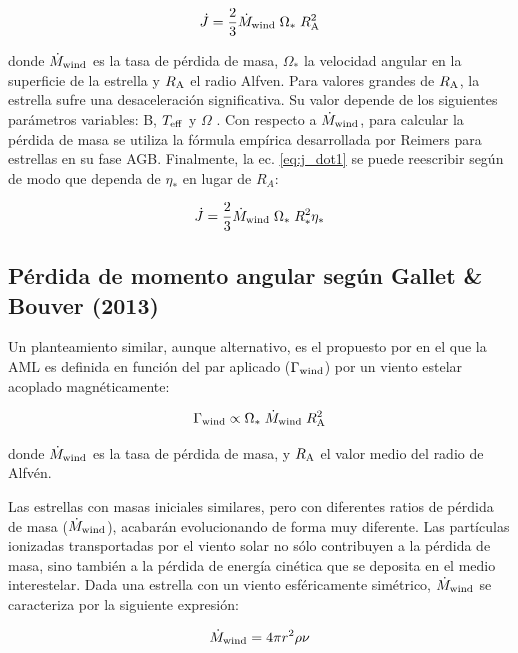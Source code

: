 \begin{equation}
 \Dot{J} = \frac{2}{3} \Dot{M}_{\mathrm{wind}} \; \Omega_* \; R_{\mathrm{A}}^{2} \label{eq:j_dot1}
\end{equation}

donde $\Dot{M}_{\mathrm{wind}}$ es la tasa de pérdida de masa, $\Omega_*$ la velocidad angular en la superficie de la estrella y $R_{\mathrm{A}}$ el radio Alfven. Para valores grandes de $R_{\mathrm{A}}$, la estrella sufre una desaceleración significativa. Su valor depende de los siguientes parámetros variables: B, $T_{\mathrm{eff}}$ y $\Omega$ \citep{Gallet2015}. Con respecto a $\Dot{M}_{\mathrm{wind}}$, para calcular la pérdida de masa se utiliza la fórmula empírica desarrollada por Reimers \citep{Reimers1975} para estrellas en su fase AGB. Finalmente, la ec. \ref{eq:j_dot1} se puede reescribir según \cite{Ud-Doula2008} de modo que dependa de $\eta_*$ en lugar de $R_A$:

\begin{equation}
 \Dot{J} = \frac{2}{3} \Dot{M}_{\mathrm{wind}} \; \Omega_* \; R^{2}_{*}\eta_* \label{eq:j_dot_mesa}
\end{equation}

\subsection{Pérdida de momento angular según Gallet \& Bouver (2013)}
Un planteamiento similar, aunque alternativo, es el propuesto por \cite{Gallet2013} en el que la AML es definida en función del par aplicado ($\Gamma_{\mathrm{wind}}$) por un viento estelar acoplado magnéticamente:

\begin{equation}
	\Gamma_{\mathrm{wind}} \propto \Omega_* \; \Dot{M}_{\mathrm{wind}} \; R_{\mathrm{A}}^{2} \label{eq:mb_torque}
\end{equation}

donde $\Dot{M}_{\mathrm{wind}}$ es la tasa de pérdida de masa, y $R_{\mathrm{A}}$ el valor medio del radio de Alfvén. \par

Las estrellas con masas iniciales similares, pero con diferentes ratios de pérdida de masa ($\Dot{M}_{\mathrm{wind}}$), acabarán evolucionando de forma muy diferente. Las partículas ionizadas transportadas por el viento solar no sólo contribuyen a la pérdida de masa, sino también a la pérdida de energía cinética que se deposita en el medio interestelar. Dada una estrella con un viento esféricamente simétrico, $\Dot{M}_{\mathrm{wind}}$ se caracteriza por la siguiente expresión:

\begin{ceqn}
	\begin{equation}
		\Dot{M}_{\mathrm{wind}} = 4\pi r^2\rho\nu \label{eq:mass_loss}
	\end{equation}
\end{ceqn}

